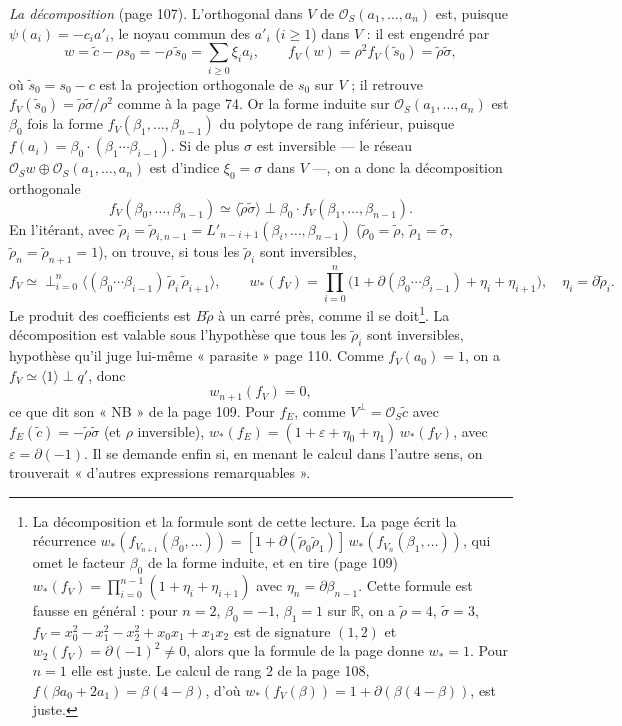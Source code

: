 \documentclass[11pt,a4paper]{article}
\begin{document}
\emph{La décomposition} (page 107). L'orthogonal dans $V$ de $\mathcal{O}_S(a_1,
\ldots, a_n)$ est, puisque $\psi(a_i) = -c_i a'_i$, le noyau commun des $a'_i$
($i \geqslant 1$) dans $V$ : il est engendré par
\[
w = \tilde c - \rho s_0 = -\rho\,\tilde s_0 = \sum_{i \geqslant 0} \xi_i a_i, \qquad
f_V(w) = \rho^2 f_V(\tilde s_0) = \tilde\rho\tilde\sigma ,
\]
où $\tilde s_0 = s_0 - c$ est la projection orthogonale de $s_0$ sur $V$ ; il
retrouve $f_V(\tilde s_0) = \tilde\rho\tilde\sigma/\rho^2$ comme à la page 74.
Or la forme induite sur $\mathcal{O}_S(a_1, \ldots, a_n)$ est $\beta_0$ fois la
forme $f_V(\beta_1, \ldots, \beta_{n-1})$ du polytope de rang inférieur, puisque
$f(a_i) = \beta_0 \cdot (\beta_1 \cdots \beta_{i-1})$. Si de plus $\sigma$ est
inversible --- le réseau $\mathcal{O}_S w \oplus \mathcal{O}_S(a_1, \ldots,
a_n)$ est d'indice $\xi_0 = \sigma$ dans $V$ ---, on a donc la décomposition
orthogonale
\[
f_V(\beta_0, \ldots, \beta_{n-1}) \simeq \langle \tilde\rho\tilde\sigma \rangle
\perp \beta_0 \cdot f_V(\beta_1, \ldots, \beta_{n-1}) .
\]
En l'itérant, avec $\tilde\rho_i = \tilde\rho_{i,n-1} = L'_{n-i+1}(\beta_i,
\ldots, \beta_{n-1})$ ($\tilde\rho_0 = \tilde\rho$, $\tilde\rho_1 = \tilde\sigma$,
$\tilde\rho_n = \tilde\rho_{n+1} = 1$), on trouve, si tous les $\tilde\rho_i$ sont
inversibles,
\[
f_V \simeq \mathop{\perp}_{i=0}^{n} \bigl\langle (\beta_0 \cdots
\beta_{i-1})\, \tilde\rho_i\,\tilde\rho_{i+1} \bigr\rangle ,
\qquad
w_*(f_V) = \prod_{i=0}^{n} \bigl(1 + \partial(\beta_0 \cdots \beta_{i-1}) +
\eta_i + \eta_{i+1}\bigr), \quad \eta_i = \partial\tilde\rho_i .
\]
Le produit des coefficients est $B\tilde\rho$ à un carré près, comme il se
doit\footnote{La décomposition et la formule sont de cette lecture. La page écrit
la récurrence $w_*(f_{V_{n+1}}(\beta_0, \ldots)) = [1 + \partial(\tilde\rho_0
\tilde\rho_1)]\, w_*(f_{V_n}(\beta_1, \ldots))$, qui omet le facteur
$\beta_0$ de la forme induite, et en tire (page 109) $w_*(f_V) = \prod_{i=0}^{n-1}
(1 + \eta_i + \eta_{i+1})$ avec $\eta_n = \partial\beta_{n-1}$. Cette formule est
fausse en général : pour $n = 2$, $\beta_0 = -1$, $\beta_1 = 1$ sur
$\mathbb{R}$, on a $\tilde\rho = 4$, $\tilde\sigma = 3$, $f_V = x_0^2 - x_1^2 -
x_2^2 + x_0x_1 + x_1x_2$ est de signature $(1, 2)$ et $w_2(f_V) =
\partial(-1)^2 \neq 0$, alors que la formule de la page donne $w_* = 1$. Pour
$n = 1$ elle est juste. Le calcul de rang $2$ de la page 108, $f(\beta a_0 +
2a_1) = \beta(4 - \beta)$, d'où $w_*(f_V(\beta)) = 1 + \partial(\beta(4 -
\beta))$, est juste.}. La décomposition est valable sous l'hypothèse que tous
les $\tilde\rho_i$ sont inversibles, hypothèse qu'il juge lui-même « parasite »
page 110. Comme $f_V(a_0) = 1$, on a $f_V \simeq \langle 1 \rangle \perp q'$,
donc
\[
w_{n+1}(f_V) = 0 ,
\]
ce que dit son « NB » de la page 109. Pour $f_E$, comme $V^\perp =
\mathcal{O}_S\tilde c$ avec $f_E(\tilde c) = -\tilde\rho\tilde\sigma$ (et $\rho$
inversible), $w_*(f_E) = (1 + \varepsilon + \eta_0 + \eta_1)\, w_*(f_V)$, avec
$\varepsilon = \partial(-1)$. Il se demande enfin si, en menant le calcul dans
l'autre sens, on trouverait « d'autres expressions remarquables ».
\end{document}

